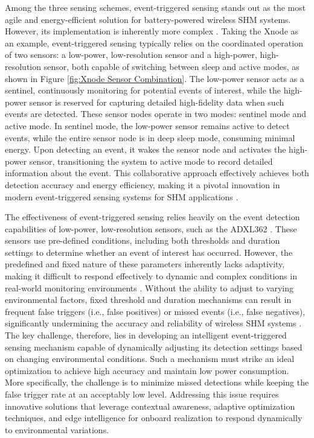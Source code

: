 \documentclass[a4paper,fleqn,numbers,sort&compress]{cas-sc}
\begin{document}
Among the three sensing schemes, event-triggered sensing stands out as the most agile and energy-efficient solution for battery-powered wireless SHM systems. However, its implementation is inherently more complex \citep{ge_dynamic_2020, sarwar_multimetric_2020}. Taking the Xnode \citep{fu_suddenevent_2019} as an example, event-triggered sensing typically relies on the coordinated operation of two sensors: a low-power, low-resolution sensor and a high-power, high-resolution sensor, both capable of switching between sleep and active modes, as shown in Figure \ref{fig:Xnode Sensor Combination}. The low-power sensor acts as a sentinel, continuously monitoring for potential events of interest, while the high-power sensor is reserved for capturing detailed high-fidelity data when such events are detected. These sensor nodes operate in two modes: sentinel mode and active mode. In sentinel mode, the low-power sensor remains active to detect events, while the entire sensor node is in deep sleep mode, consuming minimal energy. Upon detecting an event, it wakes the sensor node and activates the high-power sensor, transitioning the system to active mode to record detailed information about the event. This collaborative approach effectively achieves both detection accuracy and energy efficiency, making it a pivotal innovation in modern event-triggered sensing systems for SHM applications \citep{fu_suddenevent_2019,sarwar_multimetric_2020}.

The effectiveness of event-triggered sensing relies heavily on the event detection capabilities of low-power, low-resolution sensors, such as the ADXL362 \citep{fu_suddenevent_2019,sarwar_multimetric_2020}. These sensors use pre-defined conditions, including both thresholds and duration settings to determine whether an event of interest has occurred. However, the predefined and fixed nature of these parameters inherently lacks adaptivity, making it difficult to respond effectively to dynamic and complex conditions in real-world monitoring environments \citep{zhu_eventtriggered_2022}. Without the ability to adjust to varying environmental factors, fixed threshold and duration mechanisms can result in frequent false triggers (i.e., false positives) or missed events (i.e., false negatives), significantly undermining the accuracy and reliability of wireless SHM systems \citep{fu_sudden_2018,fu_suddenevent_2019, fu_ximpact_2022}. The key challenge, therefore, lies in developing an intelligent event-triggered sensing mechanism capable of dynamically adjusting its detection settings based on changing environmental conditions. Such a mechanism must strike an ideal optimization to achieve high accuracy and maintain low power consumption. More specifically, the challenge is to minimize missed detections while keeping the false trigger rate at an acceptably low level. Addressing this issue requires innovative solutions that leverage contextual awareness, adaptive optimization techniques, and edge intelligence for onboard realization to respond dynamically to environmental variations.
\end{document}
